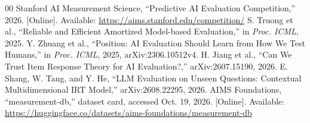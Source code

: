 \documentclass[conference]{IEEEtran}
\begin{document}
\begin{thebibliography}{00}
 Stanford AI Measurement Science, ``Predictive AI Evaluation Competition,'' 2026. [Online]. Available: \url{https://aims.stanford.edu/competition/}
 S. Truong et al., ``Reliable and Efficient Amortized Model-based Evaluation,'' in \textit{Proc. ICML}, 2025.
 Y. Zhuang et al., ``Position: AI Evaluation Should Learn from How We Test Humans,'' in \textit{Proc. ICML}, 2025, arXiv:2306.10512v4.
 H. Jiang et al., ``Can We Trust Item Response Theory for AI Evaluation?,'' arXiv:2607.15190, 2026.
 E. Shang, W. Tang, and Y. He, ``LLM Evaluation on Unseen Questions: Contextual Multidimensional IRT Model,'' arXiv:2608.22295, 2026.
 AIMS Foundations, ``measurement-db,'' dataset card, accessed Oct. 19, 2026. [Online]. Available: \url{https://huggingface.co/datasets/aims-foundations/measurement-db}
\end{thebibliography}
\end{document}
